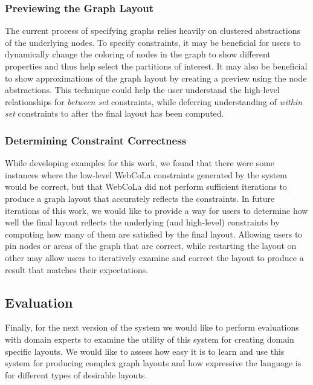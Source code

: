 \subsubsection{Previewing the Graph Layout}
The current process of specifying graphs relies heavily on clustered abstractions of the underlying nodes. To specify constraints, it may be beneficial for users to dynamically change the coloring of nodes in the graph to show different properties and thus help select the partitions of interest. It may also be beneficial to show approximations of the graph layout by creating a preview using the node abstractions. This technique could help the user understand the high-level relationships for \emph{between set} constraints, while deferring understanding of \emph{within set} constraints to after the final layout has been computed.

\subsubsection{Determining Constraint Correctness}
While developing examples for this work, we found that there were some instances where the low-level WebCoLa constraints generated by the system would be correct, but that WebCoLa did not perform sufficient iterations to produce a graph layout that accurately reflects the constraints. In future iterations of this work, we would like to provide a way for users to determine how well the final layout reflects the underlying (and high-level) constraints by computing how many of them are satisfied by the final layout. Allowing users to pin nodes or areas of the graph that are correct, while restarting the layout on other may allow users to iteratively examine and correct the layout to produce a result that matches their expectations.

\subsection{Evaluation}
Finally, for the next version of the system we would like to perform evaluations with domain experts to examine the utility of this system for creating domain specific layouts. We would like to assess how easy it is to learn and use this system for producing complex graph layouts and how expressive the language is for different types of desirable layouts.

